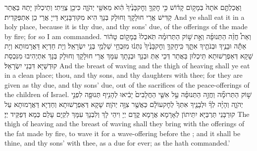 {וַאֲכַלְתֶּ֤ם אֹתָהּ֙ בְּמָק֣וֹם קָד֔וֹשׁ כִּ֣י חׇקְךָ֤ וְחׇק\maqqaf בָּנֶ֙יךָ֙ הִ֔וא מֵאִשֵּׁ֖י יְהֹוָ֑ה כִּי\maqqaf כֵ֖ן צֻוֵּֽיתִי׃}
{וְתֵיכְלוּן יָתַהּ בַּאֲתַר קַדִּישׁ אֲרֵי חוּלָקָךְ וְחוּלָק בְּנָךְ הִיא מִקּוּרְבָּנַיָּא דַּייָ אֲרֵי כֵן אִתְפַּקַּדִית׃}
{And ye shall eat it in a holy place, because it is thy due, and thy sons’ due, of the offerings of the \lord\space made by fire; for so I am commanded.}{}
{וְאֵת֩ חֲזֵ֨ה הַתְּנוּפָ֜ה וְאֵ֣ת \legarmeh  שׁ֣וֹק הַתְּרוּמָ֗ה תֹּֽאכְלוּ֙ בְּמָק֣וֹם טָה֔וֹר אַתָּ֕ה וּבָנֶ֥יךָ וּבְנֹתֶ֖יךָ אִתָּ֑ךְ כִּֽי\maqqaf חׇקְךָ֤ וְחׇק\maqqaf בָּנֶ֙יךָ֙ נִתְּנ֔וּ מִזִּבְחֵ֥י שַׁלְמֵ֖י בְּנֵ֥י יִשְׂרָאֵֽל׃}
{וְיָת חַדְיָא דַּאֲרָמוּתָא וְיָת שָׁקָא דְּאַפְרָשׁוּתָא תֵּיכְלוּן בַּאֲתַר דְּכֵי אַתְּ וּבְנָךְ וּבְנָתָךְ עִמָּךְ אֲרֵי חוּלָקָךְ וְחוּלָק בְּנָךְ אִתְיְהִיבוּ מִנִּכְסַת קוּדְשַׁיָּא דִּבְנֵי יִשְׂרָאֵל׃}
{And the breast of waving and the thigh of heaving shall ye eat in a clean place; thou, and thy sons, and thy daughters with thee; for they are given as thy due, and thy sons’ due, out of the sacrifices of the peace-offerings of the children of Israel.}{}
{שׁ֣וֹק הַתְּרוּמָ֞ה וַחֲזֵ֣ה הַתְּנוּפָ֗ה עַ֣ל אִשֵּׁ֤י הַחֲלָבִים֙ יָבִ֔יאוּ לְהָנִ֥יף תְּנוּפָ֖ה לִפְנֵ֣י יְהֹוָ֑ה וְהָיָ֨ה לְךָ֜ וּלְבָנֶ֤יךָ אִתְּךָ֙ לְחׇק\maqqaf עוֹלָ֔ם כַּאֲשֶׁ֖ר צִוָּ֥ה יְהֹוָֽה׃}
{שָׁקָא דְּאַפְרָשׁוּתָא וְחַדְיָא דַּאֲרָמוּתָא עַל קוּרְבָּנֵי תַּרְבַּיָּא יִתֵּיתוֹן לְאָרָמָא אֲרָמָא קֳדָם יְיָ וִיהֵי לָךְ וְלִבְנָךְ עִמָּךְ לִקְיָם עָלַם כְּמָא דְּפַקֵּיד יְיָ׃}
{The thigh of heaving and the breast of waving shall they bring with the offerings of the fat made by fire, to wave it for a wave-offering before the \lord; and it shall be thine, and thy sons’ with thee, as a due for ever; as the \lord\space hath commanded.’}{}
